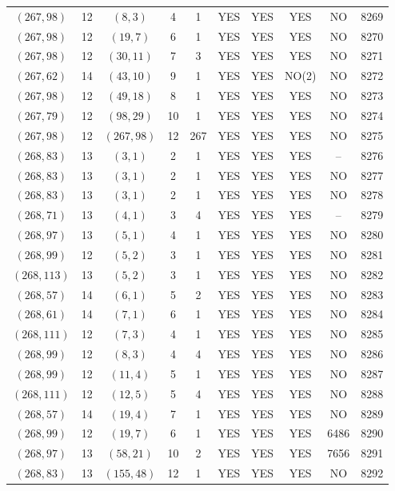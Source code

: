 \begin{longtable}{|c|c|c|c|c|c|c|c|c|c|}
$(267, 98)$ & 12 & $(8, 3)$ & 4 & 1 & YES & YES & YES & NO & 8269\\
$(267, 98)$ & 12 & $(19, 7)$ & 6 & 1 & YES & YES & YES & NO & 8270\\
$(267, 98)$ & 12 & $(30, 11)$ & 7 & 3 & YES & YES & YES & NO & 8271\\
$(267, 62)$ & 14 & $(43, 10)$ & 9 & 1 & YES & YES & NO(2) & NO & 8272\\
$(267, 98)$ & 12 & $(49, 18)$ & 8 & 1 & YES & YES & YES & NO & 8273\\
$(267, 79)$ & 12 & $(98, 29)$ & 10 & 1 & YES & YES & YES & NO & 8274\\
$(267, 98)$ & 12 & $(267, 98)$ & 12 & 267 & YES & YES & YES & NO & 8275\\
$(268, 83)$ & 13 & $(3, 1)$ & 2 & 1 & YES & YES & YES & -- & 8276\\
$(268, 83)$ & 13 & $(3, 1)$ & 2 & 1 & YES & YES & YES & NO & 8277\\
$(268, 83)$ & 13 & $(3, 1)$ & 2 & 1 & YES & YES & YES & NO & 8278\\
$(268, 71)$ & 13 & $(4, 1)$ & 3 & 4 & YES & YES & YES & -- & 8279\\
$(268, 97)$ & 13 & $(5, 1)$ & 4 & 1 & YES & YES & YES & NO & 8280\\
$(268, 99)$ & 12 & $(5, 2)$ & 3 & 1 & YES & YES & YES & NO & 8281\\
$(268, 113)$ & 13 & $(5, 2)$ & 3 & 1 & YES & YES & YES & NO & 8282\\
$(268, 57)$ & 14 & $(6, 1)$ & 5 & 2 & YES & YES & YES & NO & 8283\\
$(268, 61)$ & 14 & $(7, 1)$ & 6 & 1 & YES & YES & YES & NO & 8284\\
$(268, 111)$ & 12 & $(7, 3)$ & 4 & 1 & YES & YES & YES & NO & 8285\\
$(268, 99)$ & 12 & $(8, 3)$ & 4 & 4 & YES & YES & YES & NO & 8286\\
$(268, 99)$ & 12 & $(11, 4)$ & 5 & 1 & YES & YES & YES & NO & 8287\\
$(268, 111)$ & 12 & $(12, 5)$ & 5 & 4 & YES & YES & YES & NO & 8288\\
$(268, 57)$ & 14 & $(19, 4)$ & 7 & 1 & YES & YES & YES & NO & 8289\\
$(268, 99)$ & 12 & $(19, 7)$ & 6 & 1 & YES & YES & YES & 6486 & 8290\\
$(268, 97)$ & 13 & $(58, 21)$ & 10 & 2 & YES & YES & YES & 7656 & 8291\\
$(268, 83)$ & 13 & $(155, 48)$ & 12 & 1 & YES & YES & YES & NO & 8292\\

\end{longtable}
